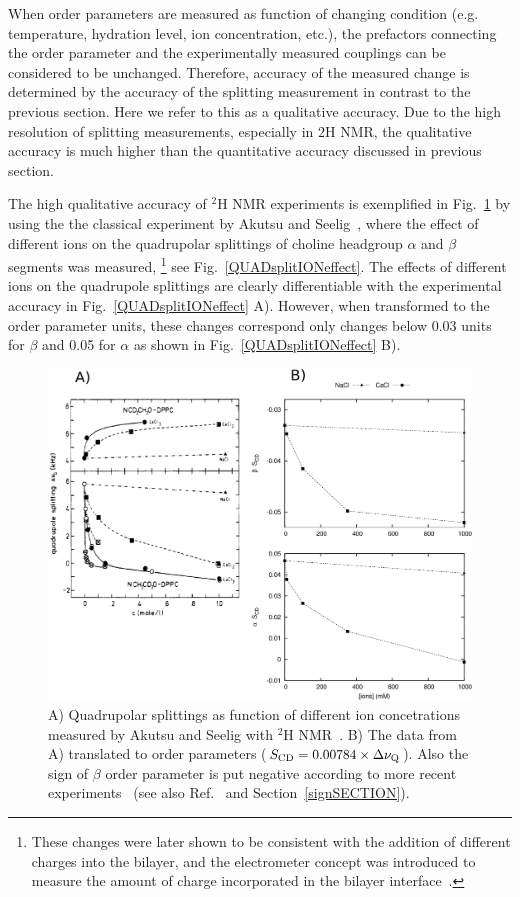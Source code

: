\documentclass[aps,prl,superscriptaddress,twocolumn]{revtex4}
\begin{document}
When order parameters are measured as function of changing condition (e.g. temperature, hydration level, ion concentration, etc.), 
the prefactors connecting the order parameter and the experimentally measured couplings can be considered 
to be unchanged. Therefore, accuracy of the measured change is determined by the accuracy of the splitting measurement
in contrast to the previous section. Here we refer to this as a qualitative accuracy. Due to the high resolution of
splitting measurements, especially in $ 2$H NMR, the qualitative accuracy is much higher than the
quantitative accuracy discussed in previous section.

The high qualitative accuracy of $^2$H NMR experiments is exemplified in Fig.~\ref{opIONeffect} by using the
the classical experiment by Akutsu and Seelig~\cite{akutsu81}, where the effect of different ions on 
the quadrupolar splittings of choline headgroup $\alpha$ and $\beta$ segments was measured, 
\footnote{These changes were later shown to be consistent with the addition of different charges into the bilayer, and the electrometer 
concept was introduced to measure the amount of charge incorporated in the bilayer interface~\cite{scherer89}.}
see Fig.~\ref{QUADsplitIONeffect}. 
The effects of different ions on the quadrupole splittings are clearly differentiable with the experimental 
accuracy in Fig.~\ref{QUADsplitIONeffect} A). However, when transformed to the order parameter units, 
these changes correspond only changes below 0.03 units for $\beta$ and 0.05 for $\alpha$ as shown in 
Fig.~\ref{QUADsplitIONeffect} B). 
\begin{figure}[]
  \includegraphics[width=17.2cm]{../Fig/QPandOPwithIONS.eps}
  \caption{\label{opIONeffect}
    A) Quadrupolar splittings as function of different ion concetrations measured by Akutsu and Seelig with $^2$H NMR~\cite{akutsu81}. 
    B) The data from A) translated to order parameters ($S_{{\rm CD}}=0.00784 \times \Delta \nu_{{\rm Q}}$). Also the sign of $\beta$ order parameter is put negative according
    to more recent experiments~\cite{hong95a,hong95b,gross97} (see also Ref.~\cite{botan15} and Section~\ref{signSECTION}).
  } 
\end{figure}
\end{document}
